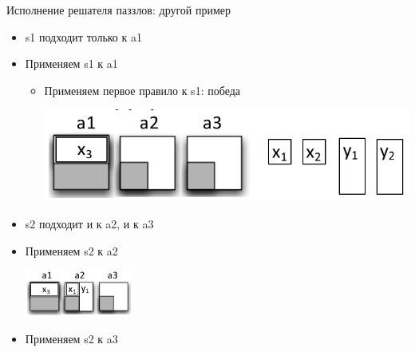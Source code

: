 \documentclass[aspectratio=169
  , xcolor={svgnames}
  , hyperref={ colorlinks,citecolor=DeepPink4
             , linkcolor=DarkRed,urlcolor=DarkBlue}
  , russian
  ]{beamer}
\theoremstyle{exerciseStyle1}
\begin{document}
\begin{frame}[fragile]{Исполнение решателя паззлов: другой пример}
\begin{minipage}{.48\textwidth}
\begin{itemize}
\item  s1 подходит только к a1 
\item Применяем s1 к a1 
  \begin{itemize}
  \item  Применяем первое правило к s1: победа
    \begin{center}
    \includegraphics[width=\linewidth]{figures/puz-example6}
    \end{center}  
  \end{itemize}
\item s2 подходит и к  a2, и к a3
\item Применяем s2 к a2

\includegraphics[width=3.5cm]{figures/puz-example7}
\item Применяем s2 к a3
\end{itemize}
\end{minipage}
\end{frame}
\end{document}
